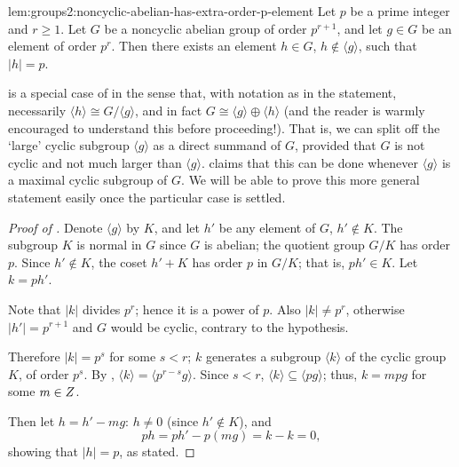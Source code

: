 \begin{lem}{}{lem:groups2:noncyclic-abelian-has-extra-order-p-element}
  Let $p$ be a prime integer and $r \geq 1$. Let $G$ be a noncyclic
  abelian group of order $p^{r+1}$, and let $g \in G$ be an element of
  order $p^r$. Then there exists an element $h \in G$,
  $h \notin \langle g \rangle$, such that $|h| = p$.
\end{lem}
 is a special case of  in
the sense that, with notation as in the statement, necessarily
$\langle h \rangle \cong G/\langle g \rangle$, and in fact
$G \cong \langle g \rangle \oplus \langle h \rangle$ (and the reader
is warmly encouraged to understand this before proceeding!). That is,
we can split off the `large' cyclic subgroup $\langle g \rangle$ as a
direct summand of $G$, provided that $G$ is not cyclic and not much
larger than $\langle g \rangle$.  claims that
this can be done whenever $\langle g \rangle$ is a maximal cyclic
subgroup of $G$. We will be able to prove this more general statement
easily once the particular case is settled.
\begin{proof}[Proof of ]
  Denote $\langle g \rangle$ by $K$, and let $h'$ be any element of
  $G$, $h' \notin K$. The subgroup $K$ is normal in $G$ since $G$ is
  abelian; the quotient group $G/K$ has order $p$. Since
  $h' \notin K$, the coset $h' + K$ has order $p$ in $G/K$; that is,
  $ph' \in K$. Let $k = ph'$.

  Note that $|k|$ divides $p^r$; hence it is a power of $p$. Also
  $|k| \neq p^r$, otherwise $|h'| = p^{r+1}$ and $G$ would be cyclic,
  contrary to the hypothesis.

  Therefore $|k| = p^s$ for some $s < r$; $k$ generates a subgroup
  $\langle k \rangle$ of the cyclic group $K$, of order $p^s$. By
  ,
  $\langle k \rangle = \langle p^{r-s} g \rangle$.  Since $s < r$,
  $\langle k \rangle \subseteq \langle pg \rangle$; thus, $k = mpg$
  for some $m \in Z$.

  Then let $h = h' - mg$: $h \neq 0$ (since $h' \notin K$), and
  \[ph = ph' - p(mg) = k - k = 0,\] showing that $|h| = p$, as stated.
\end{proof}
